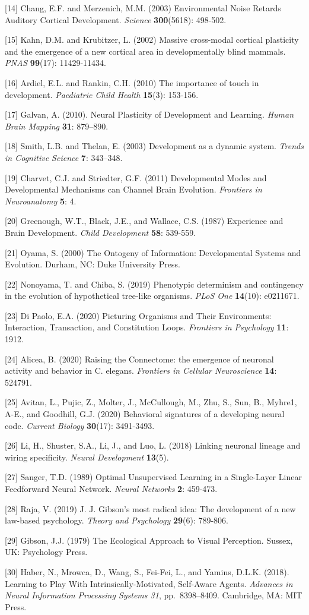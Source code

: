 \documentclass{article}
\begin{document}
[14] Chang, E.F. and Merzenich, M.M. (2003) Environmental Noise Retards Auditory Cortical Development. {\it Science} {\bf 300}(5618): 498-502.

[15] Kahn, D.M. and Krubitzer, L. (2002) Massive cross-modal cortical plasticity and the emergence of a new cortical area in developmentally blind mammals. {\it PNAS} {\bf 99}(17): 11429-11434.

[16] Ardiel, E.L. and Rankin, C.H. (2010) The importance of touch in development. {\it Paediatric Child Health} {\bf 15}(3): 153-156.

[17] Galvan, A. (2010). Neural Plasticity of Development and Learning. {\it Human Brain Mapping} {\bf 31}: 879–890.

[18] Smith, L.B. and Thelan, E. (2003) Development as a dynamic system. {\it Trends in Cognitive Science} {\bf 7}: 343–348.

[19] Charvet, C.J. and Striedter, G.F. (2011) Developmental Modes and Developmental Mechanisms can Channel Brain Evolution. {\it Frontiers in Neuroanatomy} {\bf 5}: 4.

[20] Greenough, W.T., Black, J.E., and Wallace, C.S. (1987) Experience and Brain Development. {\it Child Development} {\bf 58}: 539-559.

[21] Oyama, S. (2000) The Ontogeny of Information: Developmental Systems and Evolution. Durham, NC: Duke University Press.

[22] Nonoyama, T. and Chiba, S. (2019) Phenotypic determinism and contingency in the evolution of hypothetical tree-like organisms. {\it PLoS One} {\bf 14}(10): e0211671.

[23] Di Paolo, E.A. (2020) Picturing Organisms and Their Environments: Interaction, Transaction, and Constitution Loops. {\it Frontiers in Psychology} {\bf 11}: 1912.

[24] Alicea, B. (2020) Raising the Connectome: the emergence of neuronal activity and behavior in C. elegans. {\it Frontiers in Cellular Neuroscience} {\bf 14}: 524791. 

[25] Avitan, L., Pujic, Z., Molter, J., McCullough, M., Zhu, S., Sun, B., Myhre1, A-E., and Goodhill, G.J. (2020) Behavioral signatures of a developing neural code. {\it Current Biology} {\bf 30}(17): 3491-3493.

[26] Li, H., Shuster, S.A., Li, J., and Luo, L. (2018) Linking neuronal lineage and wiring specificity. {\it Neural Development} {\bf 13}(5).

[27] Sanger, T.D. (1989) Optimal Unsupervised Learning in a Single-Layer Linear Feedforward Neural Network. {\it Neural Networks} {\bf 2}: 459-473.

[28] Raja, V. (2019) J. J. Gibson’s most radical idea: The development of a new law-based psychology. {\it Theory and Psychology} {\bf 29}(6): 789-806.

[29] Gibson, J.J. (1979) The Ecological Approach to Visual Perception. Sussex, UK: Psychology Press.

[30] Haber, N., Mrowca, D., Wang, S., Fei-Fei, L., and Yamins, D.L.K. (2018). Learning to Play With Intrinsically-Motivated, Self-Aware Agents. {\it Advances in Neural Information Processing Systems 31}, pp.\ 8398–8409. Cambridge, MA: MIT Press.
\end{document}
